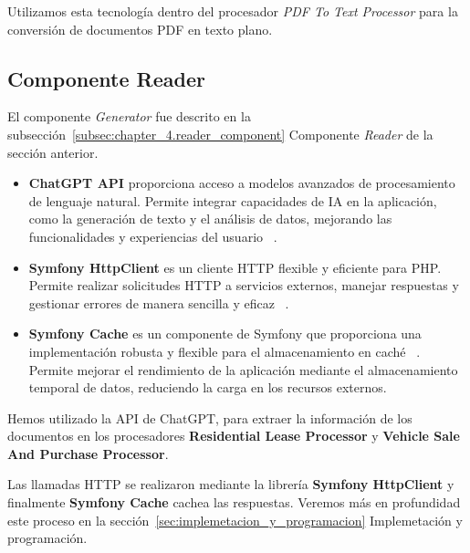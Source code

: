 Utilizamos esta tecnología dentro del procesador \textit{PDF To Text Processor} para la conversión de documentos PDF en
texto plano.

\subsection*{Componente Reader}

El componente \textit{Generator} fue descrito en la subsección~\ref{subsec:chapter_4.reader_component} Componente
\textit{Reader} de la sección anterior.

\begin{itemize}
    \item \textbf{ChatGPT API} proporciona acceso a modelos avanzados de procesamiento de lenguaje natural.
    Permite integrar capacidades de IA en la aplicación, como la generación de texto y el análisis de datos, mejorando
    las funcionalidades y experiencias del usuario ~\cite{https://platform.openai.com/docs/api-reference/chat}.
    \item \textbf{Symfony HttpClient} es un cliente HTTP flexible y eficiente para PHP. Permite realizar solicitudes
    HTTP a servicios externos, manejar respuestas y gestionar errores de manera sencilla y eficaz
    ~\cite{https://symfony.com/doc/current/http_client.html}.
    \item \textbf{Symfony Cache} es un componente de Symfony que proporciona una implementación robusta y flexible
    para el almacenamiento en caché ~\cite{https://symfony.com/doc/current/components/cache.html}.
    Permite mejorar el rendimiento de la aplicación mediante el almacenamiento temporal de datos, reduciendo la carga en
    los recursos externos.
\end{itemize}

Hemos utilizado la API de ChatGPT, para extraer la información de los documentos en los procesadores
\textbf{Residential Lease Processor} y \textbf{Vehicle Sale And Purchase Processor}.

Las llamadas HTTP se realizaron mediante la librería \textbf{Symfony HttpClient} y finalmente \textbf{Symfony Cache}
cachea las respuestas.
Veremos más en profundidad este proceso en la sección~\ref{sec:implemetacion_y_programacion} Implemetación y
programación.



